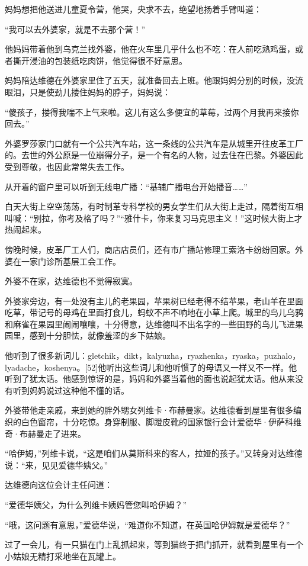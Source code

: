 妈妈想把他送进儿童夏令营，他哭，央求不去，绝望地扬着手臂叫道：

“我可以去外婆家，就是不去那个营！”

他妈妈带着他到乌克兰找外婆，他在火车里几乎什么也不吃：在人前吃熟鸡蛋，或者撕开浸油的包装纸吃肉饼，他觉得很不好意思。

妈妈陪达维德在外婆家里住了五天，就准备回去上班。他跟妈妈分别的时候，没流眼泪，只是使劲儿搂住妈妈的脖子，妈妈说：

“傻孩子，搂得我喘不上气来啦。这儿有这么多便宜的草莓，过两个月我再来接你回去。”

外婆罗莎家门口就有一个公共汽车站，这一条线的公共汽车是从城里开往皮革工厂的。去世的外公原是一位崩得分子，是一个有名的人物，过去住在巴黎。外婆因此受到尊敬，也因此常常失去工作。

从开着的窗户里可以听到无线电广播：“基辅广播电台开始播音……”

白天大街上空空荡荡，有时制革专科学校的男女学生们从大街上走过，隔着街互相叫喊：“别拉，你考及格了吗？”“雅什卡，你来复习马克思主义！”这时候大街上才热闹起来。

傍晚时候，皮革厂工人们，商店店员们，还有市广播站修理工索洛卡纷纷回家。外婆在一家门诊所基层工会工作。

外婆不在家，达维德也不觉得寂寞。

外婆家旁边，有一处没有主儿的老果园，苹果树已经老得不结苹果，老山羊在里面吃草，带记号的母鸡在里面打食儿，蚂蚁不声不响地在小草上爬。城里的鸟儿乌鸦和麻雀在果园里闹闹嚷嚷，十分得意，达维德叫不出名字的一些田野的鸟儿飞进果园里，感到十分胆怯，就像羞涩的乡下姑娘。

他听到了很多新词儿：gletchik，dikt，kalyuzha，ryazhenka，ryaska，puzhalo，lyadache，koshenya。[52]他听出这些词儿和他听惯了的母语又一样又不一样。他听到了犹太话。他感到惊讶的是，妈妈和外婆当着他的面也说起犹太话。他从来没有听到妈妈说过这种他不懂的话。

外婆带他走亲戚，来到她的胖外甥女列维卡·布赫曼家。达维德看到屋里有很多编织的白色窗帘，十分吃惊。身穿制服、脚蹬皮靴的国家银行会计爱德华·伊萨科维奇·布赫曼走了进来。

“哈伊姆，”列维卡说，“这是咱们从莫斯科来的客人，拉娅的孩子。”又转身对达维德说：“来，见见爱德华姨父。”

达维德向这位会计主任问道：

“爱德华姨父，为什么列维卡姨妈管您叫哈伊姆？”

“哦，这问题有意思，”爱德华说，“难道你不知道，在英国哈伊姆就是爱德华？”

过了一会儿，有一只猫在门上乱抓起来，等到猫终于把门抓开，就看到屋里有一个小姑娘无精打采地坐在瓦罐上。

